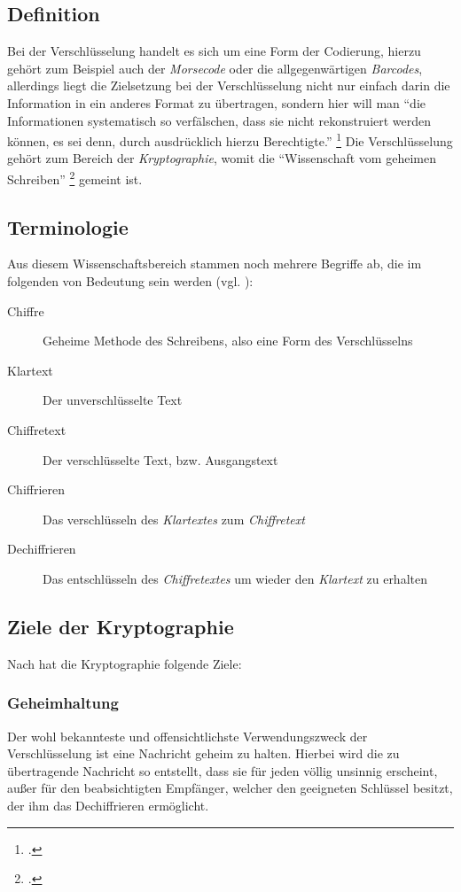 \documentclass{scrarticle}
\begin{document}
    \subsection{Definition}
    Bei der Verschlüsselung handelt es sich um eine Form der Codierung, hierzu gehört zum Beispiel auch der \emph{Morsecode} oder die allgegenwärtigen \emph{Barcodes}, allerdings liegt die Zielsetzung bei der Verschlüsselung nicht nur einfach darin die Information in ein anderes Format zu übertragen, sondern hier will man \enquote{die Informationen systematisch so verfälschen, dass sie nicht rekonstruiert werden können, es sei denn, durch ausdrücklich hierzu Berechtigte.} \footcite[263]{dankmeier2006}
    Die Verschlüsselung gehört zum Bereich der \emph{Kryptographie}, womit die \enquote{Wissenschaft vom geheimen Schreiben} \footcite[1]{watjen2008} gemeint ist.

    \subsection*{Terminologie}
    Aus diesem Wissenschaftsbereich stammen noch mehrere Begriffe ab, die im folgenden von Bedeutung sein werden (vgl. \cite[17]{ertel2003}):
    \begin{description}
        \item[Chiffre] Geheime Methode des Schreibens, also eine Form des Verschlüsselns
        \item[Klartext] Der unverschlüsselte Text
        \item[Chiffretext] Der verschlüsselte Text, bzw. Ausgangstext
        \item[Chiffrieren] Das verschlüsseln des \emph{Klartextes} zum \emph{Chiffretext}
        \item[Dechiffrieren] Das entschlüsseln des \emph{Chiffretextes} um wieder den \emph{Klartext} zu erhalten
    \end{description}

    \subsection[Ziele]{Ziele der Kryptographie}
    Nach \cite[][16-21]{beutelspacher2015} hat die Kryptographie folgende Ziele:
    \subsubsection{Geheimhaltung}
    Der wohl bekannteste und offensichtlichste Verwendungszweck der Verschlüsselung ist eine Nachricht geheim zu halten. Hierbei wird die zu übertragende Nachricht so entstellt, dass sie für jeden völlig unsinnig erscheint, außer für den beabsichtigten Empfänger, welcher den geeigneten Schlüssel besitzt, der ihm das Dechiffrieren ermöglicht.
\end{document}
